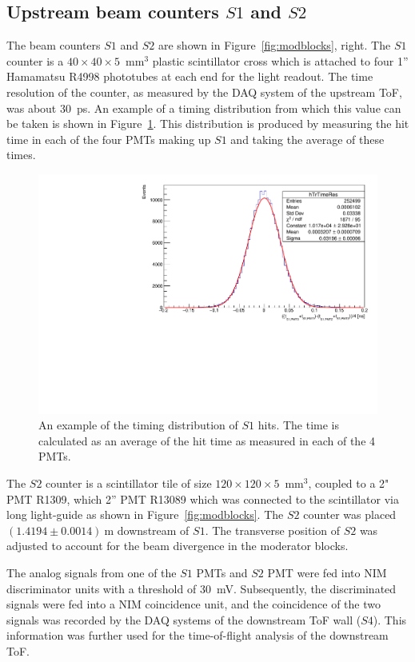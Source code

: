 \subsection{Upstream beam counters $\mathit{S1}$ and $\mathit{S2}$}
\label{subsec:s1s2Exp}
The beam counters $\mathit{S1}$ and $\mathit{S2}$ are shown in Figure~\ref{fig:modblocks}, right.
The $\mathit{S1}$ counter is a $40\times40\times5$~mm$^3$ plastic scintillator cross which is attached to four 1'' Hamamatsu R4998 phototubes at each end for the light readout.
The time resolution of the counter, as measured by the DAQ system of the upstream ToF, was about 30~ps.
An example of a timing distribution from which this value can be taken is shown in Figure~\ref{fig:s3Res}.
This distribution is produced by measuring the hit time in each of the four PMTs making up $\mathit{S1}$ and taking the average of these times.
\begin{figure}
  \centering
  \includegraphics[width=0.65\linewidth]{files/Figures/TrTimeRes.pdf}
  \caption{An example of the timing distribution of $\mathit{S1}$ hits. The time is calculated as an average of the hit time as measured in each of the 4 PMTs.}
  \label{fig:s3Res}
\end{figure}

The $\mathit{S2}$ counter is a scintillator tile of size $120\times120\times5$~mm$^3$, coupled to a 2" PMT R1309, which  2'' PMT R13089 which was connected to the scintillator via long light-guide as shown in Figure~\ref{fig:modblocks}.
The $\mathit{S2}$ counter was placed $(1.4194 \pm 0.0014)~\text{m}$ downstream of $\mathit{S1}$.
The transverse position of $\mathit{S2}$ was adjusted to account for the beam divergence in the moderator blocks.

The analog signals from one of the $\mathit{S1}$ PMTs and $\mathit{S2}$ PMT were fed into NIM discriminator units with a threshold of 30~mV.
Subsequently, the discriminated signals were fed into a NIM coincidence unit, and the coincidence of the two signals was recorded by the DAQ systems of the downstream ToF wall ($\mathit{S4}$).
This information was further used for the time-of-flight analysis of the downstream ToF.


